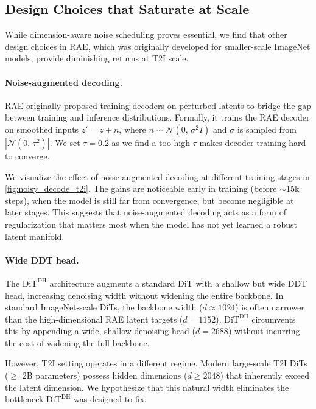 \documentclass[10pt,twocolumn,letterpaper]{article}
\newcommand{\DDT}{$\text{DiT}^{\text{DH}}$\xspace} %
\begin{document}
\subsection{Design Choices that Saturate at Scale}\label{subsec: saturating designs}

While dimension-aware noise scheduling proves essential, we find that other design choices in RAE, which was originally developed for smaller-scale ImageNet models, provide diminishing returns at T2I scale.

\paragraph{Noise-augmented decoding.}
RAE originally proposed training decoders on perturbed latents to bridge the gap between training and inference distributions.
Formally, it trains the RAE decoder on smoothed inputs \(z' = z + n\), where \(n \sim \mathcal{N}(0,\, \sigma^2 I)\) and \(\sigma\) is sampled from \(|\mathcal{N}(0,\, \tau^2)|\).  We set $\tau = 0.2$ as we find a too high $\tau$ makes decoder training hard to converge.

We visualize the effect of noise-augmented decoding at different training stages in \cref{fig:noisy_decode_t2i}.
The gains are noticeable early in training (before \(\sim\)15k steps), when the model is still far from convergence, but become negligible at later stages.
This suggests that noise-augmented decoding acts as a form of regularization that matters most when the model has not yet learned a robust latent manifold.


\paragraph{Wide DDT head.}
The \DDT{} architecture augments a standard DiT with a shallow but wide DDT head, increasing denoising width without widening the entire backbone. In standard ImageNet-scale DiTs, the backbone width ($d \approx 1024$) is often narrower than the high-dimensional RAE latent targets ($d=1152$). \DDT{} circumvents this by appending a wide, shallow denoising head ($d=2688$) without incurring the cost of widening the full backbone.

However, T2I setting operates in a different regime. Modern large-scale T2I DiTs~\citep{flux, wu2025qwen} ($\geq$ 2B parameters) possess hidden dimensions ($d \geq 2048$) that inherently exceed the latent dimension. We hypothesize that this natural width eliminates the bottleneck \DDT{} was designed to fix.
\end{document}

